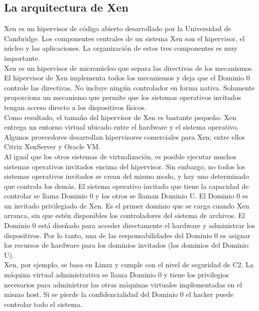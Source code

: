 \subsection{La arquitectura de Xen}
Xen es un hipervisor de código abierto desarrollado por la Universidad de Cambridge. Los componentes centrales de un sistema Xen son el hipervisor, el núcleo y las aplicaciones. La organización de estos tres componentes es muy importante.\\

Xen es un hipervisor de micronúcleo que separa las directivas de los mecanismos. El hipervisor de Xen implementa todos los mecanismos y deja que el Dominio 0 controle las directivas. No incluye ningún controlador en forma nativa. Solamente proporciona un mecanismo que permite que los sistemas operativos invitados tengan acceso directo a los dispositivos físicos.\\

Como resultado, el tamaño del hipervisor de Xen es bastante pequeño. Xen entrega un entorno virtual ubicado entre el hardware y el sistema operativo. Algunos proveedores desarrollan hipervisores comerciales para Xen; entre ellos Citrix XenServer y Oracle VM.\\

Al igual que los otros sistemas de virtualización, es posible ejecutar muchos sistemas operativos invitados encima del hipervisor. Sin embargo, no todos los sistemas operativos invitados se crean del mismo modo, y hay uno determinado que controla los demás. El sistema operativo invitado que tiene la capacidad de controlar se llama Dominio 0 y los otros se llaman Dominio U. El Dominio 0 es un invitado privilegiado de Xen. Es el primer dominio que se carga cuando Xen arranca, sin que estén disponibles los controladores del sistema de archivos. El Dominio 0 está diseñado para acceder directamente el hardware y administrar los dispositivos. Por lo tanto, una de las responsabilidades del Dominio 0 es asignar los recursos de hardware para los dominios invitados (los dominios del Dominio U).\\

Xen, por ejemplo, se basa en Linux y cumple con el nivel de seguridad de C2. La máquina virtual administrativa se llama Dominio 0 y tiene los privilegios necesarios para administrar las otras máquinas virtuales implementadas en el mismo host. Si se pierde la confidencialidad del Dominio 0 el hacker puede controlar todo el sistema.\\

